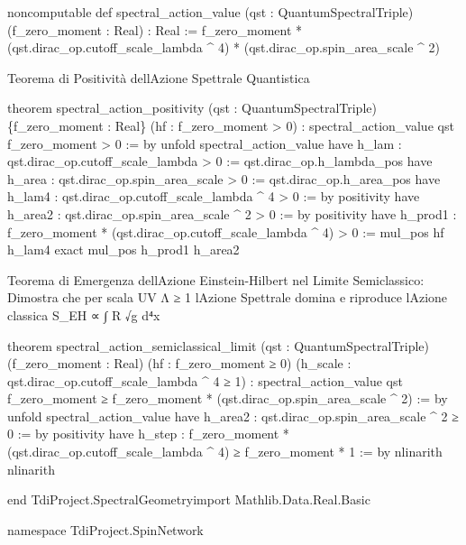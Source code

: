 \documentclass{article}
\newenvironment{Shaded}{%
  \begin{snugshade}%
}{%
  \end{snugshade}%
}%
\newenvironment{Highlighting}{%
}{%
}%
\newcommand{\NormalTok}[1]{#1}
\begin{document}
\begin{Shaded}
\begin{Highlighting}[]
\NormalTok{noncomputable def spectral\_action\_value (qst : QuantumSpectralTriple) (f\_zero\_moment : Real) : Real :=}
\NormalTok{  f\_zero\_moment * (qst.dirac\_op.cutoff\_scale\_lambda \^{} 4) * (qst.dirac\_op.spin\_area\_scale \^{} 2)}

\end{Highlighting}
\end{Shaded}

Teorema di Positività dell\textquotesingle Azione Spettrale Quantistica

\begin{Shaded}
\begin{Highlighting}[]
\NormalTok{theorem spectral\_action\_positivity (qst : QuantumSpectralTriple) \{f\_zero\_moment : Real\}}
\NormalTok{    (hf : f\_zero\_moment \textgreater{} 0) :}
\NormalTok{  spectral\_action\_value qst f\_zero\_moment \textgreater{} 0 := by}
\NormalTok{  unfold spectral\_action\_value}
\NormalTok{  have h\_lam : qst.dirac\_op.cutoff\_scale\_lambda \textgreater{} 0 := qst.dirac\_op.h\_lambda\_pos}
\NormalTok{  have h\_area : qst.dirac\_op.spin\_area\_scale \textgreater{} 0 := qst.dirac\_op.h\_area\_pos}
\NormalTok{  have h\_lam4 : qst.dirac\_op.cutoff\_scale\_lambda \^{} 4 \textgreater{} 0 := by positivity}
\NormalTok{  have h\_area2 : qst.dirac\_op.spin\_area\_scale \^{} 2 \textgreater{} 0 := by positivity}
\NormalTok{  have h\_prod1 : f\_zero\_moment * (qst.dirac\_op.cutoff\_scale\_lambda \^{} 4) \textgreater{} 0 := mul\_pos hf h\_lam4}
\NormalTok{  exact mul\_pos h\_prod1 h\_area2}

\end{Highlighting}
\end{Shaded}

Teorema di Emergenza dell\textquotesingle Azione Einstein-Hilbert nel
Limite Semiclassico: Dimostra che per scala UV Λ ≥ 1
l\textquotesingle Azione Spettrale domina e riproduce
l\textquotesingle Azione classica S\_EH ∝ ∫ R √g d⁴x

\begin{Shaded}
\begin{Highlighting}[]
\NormalTok{theorem spectral\_action\_semiclassical\_limit}
\NormalTok{    (qst : QuantumSpectralTriple)}
\NormalTok{    (f\_zero\_moment : Real)}
\NormalTok{    (hf : f\_zero\_moment ≥ 0)}
\NormalTok{    (h\_scale : qst.dirac\_op.cutoff\_scale\_lambda \^{} 4 ≥ 1) :}
\NormalTok{  spectral\_action\_value qst f\_zero\_moment ≥ f\_zero\_moment * (qst.dirac\_op.spin\_area\_scale \^{} 2) := by}
\NormalTok{  unfold spectral\_action\_value}
\NormalTok{  have h\_area2 : qst.dirac\_op.spin\_area\_scale \^{} 2 ≥ 0 := by positivity}
\NormalTok{  have h\_step : f\_zero\_moment * (qst.dirac\_op.cutoff\_scale\_lambda \^{} 4) ≥ f\_zero\_moment * 1 := by nlinarith}
\NormalTok{  nlinarith}

\NormalTok{end TdiProject.SpectralGeometryimport Mathlib.Data.Real.Basic}

\NormalTok{namespace TdiProject.SpinNetwork}

\end{Highlighting}
\end{Shaded}
\end{document}
